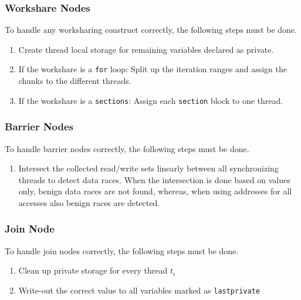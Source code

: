 \documentclass[natbib]{article}
\begin{document}
\subsubsection{Workshare Nodes}
To handle any worksharing construct correctly, the following steps must be done.
\begin{enumerate}
\item Create thread local storage for remaining variables declared as private.
\item If the workshare is a \texttt{for} loop: Split up the iteration ranges and assign the chunks to the different threads.
\item If the workshare is a \texttt{sections}: Assign each \texttt{section} block to one thread.
\end{enumerate}

\subsubsection{Barrier Nodes}
To handle barrier nodes correctly, the following steps must be done.
\begin{enumerate}
\item Intersect the collected read/write sets linearly between all synchronizing threads to detect data races.
When the intersection is done based on values only, benign data races are not found, whereas, when using addresses for all accesses also benign races are detected.
\end{enumerate}

\subsubsection{Join Node}
To handle join nodes correctly, the following steps must be done.
\begin{enumerate}
\item Clean up private storage for every thread $t_i$
\item Write-out the correct value to all variables marked as \texttt{lastprivate}
\end{enumerate}





\end{document}
